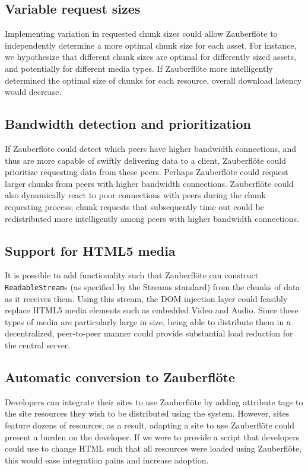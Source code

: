 \documentclass[letterpaper,twocolumn,10pt]{article}
\newcommand{\zbf}{Zauberfl\"{o}te\xspace}
\begin{document}
\subsection{Variable request sizes}

Implementing variation in requested chunk sizes could allow \zbf to independently
determine a more optimal chunk size for each asset. For instance, we hypothesize
that different chunk sizes are optimal for differently sized assets, and potentially
for different media types. If \zbf more intelligently determined the optimal size
of chunks for each resource, overall download latency would decrease.

\subsection{Bandwidth detection and prioritization}

If \zbf could detect which peers have higher bandwidth connections, and thus
are more capable of swiftly delivering data to a client, \zbf could prioritize
requesting data from these peers. Perhaps \zbf could request larger chunks from
peers with higher bandwidth connections. \zbf could also dynamically react to
poor connections with peers during the chunk requesting process; chunk requests
that subsequently time out could be redistributed more intelligently among
peers with higher bandwidth connections.

\subsection{Support for HTML5 media}
It is possible to add functionality such that \zbf can construct
\texttt{ReadableStream}s (as specified by the Streams standard)
from the chunks of data as it receives them. Using this stream, the DOM injection
layer could feasibly replace HTML5 media elements such as embedded Video and Audio.
Since these types of media are particularly large in size, being able to distribute
them in a decentralized, peer-to-peer manner could provide substantial load
reduction for the central server.

\subsection{Automatic conversion to \zbf}
Developers can integrate their sites to use \zbf by adding attribute tags to
the site resources they wish to be distributed using the system. However, sites feature
dozens of resources; as a result, adapting a site to use \zbf could present a
burden on the developer. If we were to provide a script that developers could use
to change HTML such that all resources were loaded using \zbf, this would ease
integration pains and increase adoption.
\end{document}
